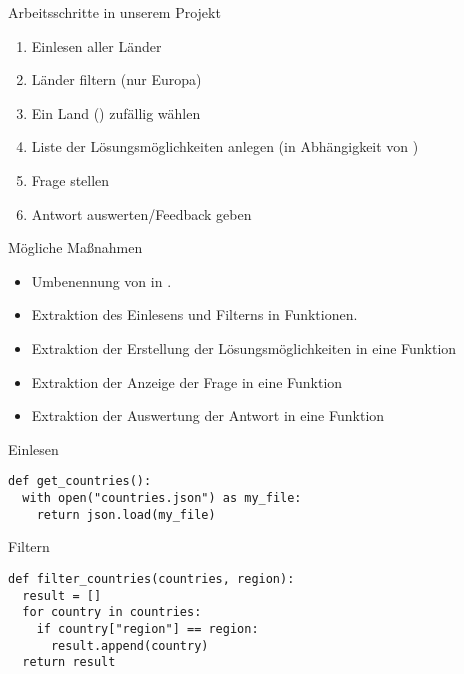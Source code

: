 \begin{frame}
	
\begin{block}{Arbeitsschritte in unserem Projekt}
\vspace{2pt}
\pause 
\begin{enumerate}[<+->]
	\item Einlesen aller Länder
	\item Länder filtern (nur Europa)
	\item Ein Land () zufällig wählen
	\item Liste der Lösungsmöglichkeiten anlegen (in Abhängigkeit von )
	\item Frage stellen
	\item Antwort auswerten/Feedback geben
\end{enumerate}
\end{block}
	
\end{frame}

\begin{frame}
	\begin{block}{Mögliche Maßnahmen}
		\vspace{2pt}
	\pause 
	\begin{itemize}[<+->]
	\item Umbenennung von  in .
	\item Extraktion des Einlesens und Filterns in Funktionen.
    \item Extraktion der Erstellung der Lösungsmöglichkeiten in eine Funktion
    \item Extraktion der Anzeige der Frage in eine Funktion
    \item Extraktion der Auswertung der Antwort in eine Funktion 
	\end{itemize}	
	\end{block}
\end{frame}


\begin{fragile}

\begin{block}{Einlesen}
\vspace{2pt}
\begin{verbatim}
def get_countries():
  with open("countries.json") as my_file:
    return json.load(my_file)
\end{verbatim}
\end{block}

\vspace{12pt}
\pause 

\begin{block}{Filtern}
\vspace{2pt}
\begin{verbatim}
def filter_countries(countries, region):
  result = []
  for country in countries:
    if country["region"] == region:
      result.append(country)
  return result
\end{verbatim}
\end{block}

\end{fragile}

